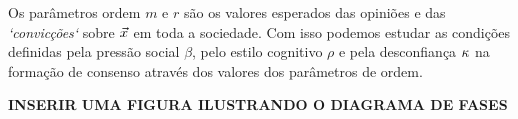 Os parâmetros ordem $m$ e $r$ são os valores esperados das opiniões e
das \emph{`convicções`} sobre $\vec{x}$ em toda a sociedade. Com isso
podemos estudar as condições definidas pela pressão social $\beta$,
pelo estilo cognitivo $\rho$ e pela desconfiança $\kappa$ na formação de
consenso através dos valores dos parâmetros de ordem. 

{\bf INSERIR UMA FIGURA ILUSTRANDO O DIAGRAMA DE FASES} %


